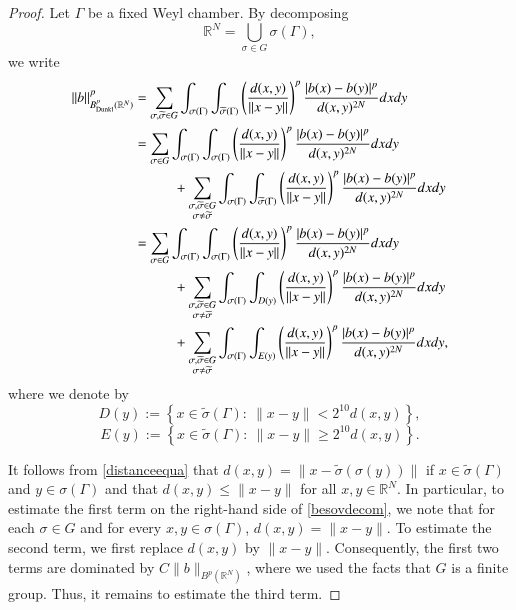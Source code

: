 \documentclass[12pt]{amsart}
\begin{document}
\begin{proof}
Let $\Gamma$ be a  fixed Weyl chamber. By decomposing
$$\mathbb{R}^N=\bigcup_{\sigma\in G}\sigma(\Gamma),$$
we write
\begin{align}\label{besovdecom}
\|b\|_{B^{p}_{{\rm Dunkl}}(\mathbb{R}^N)}^p&=\sum_{\sigma,\widetilde{\sigma}\in G}\int_{\sigma(\Gamma)}\int_{\widetilde{\sigma}(\Gamma)}\left(\frac{d(x,y)}{\|x-y\|}\right)^p\frac{|b(x)-b(y)|^p}{d(x,y)^{2N}}dxdy\nonumber\\
&=\sum_{\sigma\in G}\int_{\sigma(\Gamma)}\int_{\sigma(\Gamma)}\left(\frac{d(x,y)}{\|x-y\|}\right)^p\frac{|b(x)-b(y)|^p}{d(x,y)^{2N}}dxdy\nonumber\\
&\hspace{1.0cm}+\sum_{{\substack{\sigma,\widetilde{\sigma}\in G \\ \sigma\neq \widetilde{\sigma}}}}\int_{\sigma(\Gamma)}\int_{\widetilde{\sigma}(\Gamma)}\left(\frac{d(x,y)}{\|x-y\|}\right)^p\frac{|b(x)-b(y)|^p}{d(x,y)^{2N}}dxdy\nonumber\\
&=\sum_{\sigma\in G}\int_{\sigma(\Gamma)}\int_{\sigma(\Gamma)}\left(\frac{d(x,y)}{\|x-y\|}\right)^p\frac{|b(x)-b(y)|^p}{d(x,y)^{2N}}dxdy\nonumber\\
&\hspace{1.0cm}+\sum_{{\substack{\sigma,\widetilde{\sigma}\in G \\ \sigma\neq \widetilde{\sigma}}}}\int_{\sigma(\Gamma)}\int_{D(y)}\left(\frac{d(x,y)}{\|x-y\|}\right)^p\frac{|b(x)-b(y)|^p}{d(x,y)^{2N}}dxdy\nonumber\\
&\hspace{1.0cm}+\sum_{{\substack{\sigma,\widetilde{\sigma}\in G \\ \sigma\neq \widetilde{\sigma}}}}\int_{\sigma(\Gamma)}\int_{E(y)}\left(\frac{d(x,y)}{\|x-y\|}\right)^p\frac{|b(x)-b(y)|^p}{d(x,y)^{2N}}dxdy,
\end{align}
where we denote by
$$D(y):=\left\{x\in \widetilde{\sigma}(\Gamma):\ \|x-y\|< 2^{10}d(x,y)\right\},$$
$$E(y):=\left\{x\in \widetilde{\sigma}(\Gamma):\ \|x-y\|\geq 2^{10}d(x,y)\right\}.$$

It follows from \eqref{distanceequa} that $d(x,y)=\|x-\widetilde{\sigma}(\sigma(y))\|$ if $x\in \widetilde{\sigma}(\Gamma)$ and $y\in \sigma(\Gamma)$ and that $d(x,y)\leq \|x-y\|$ for all $x,y\in\mathbb{R}^N$. In particular, to estimate the first term on the right-hand side of \eqref{besovdecom}, we note that for each $\sigma\in G$ and for every $x,y\in\sigma(\Gamma)$, $d(x,y)=\|x-y\|$. To estimate the second term, we first 
replace $d(x,y)$ by $\|x-y\|$. Consequently, the first two terms are dominated by $C\|b\|_{B^{p}(\mathbb{R}^N)}$, where we used the facts that $G$ is a finite group. Thus, it remains to estimate the third term.


\end{proof}
\end{document}
